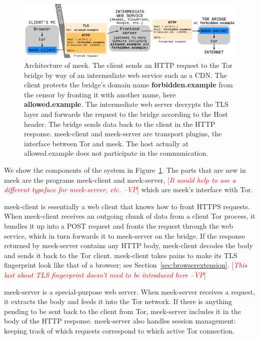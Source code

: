 \documentclass{sig-alternate}
\newcommand{\meekclient}{\mbox{meek-client}\xspace}
\newcommand{\meekserver}{\mbox{meek-server}\xspace}
\newcommand{\meek}{meek\xspace}
\newcommand{\note}[1]{{\textcolor{red}{[\textit{#1}]}}}
\newcommand{\vp}[1]{\note{#1 --VP}}
\begin{document}
\begin{figure}
\centering
\includegraphics[width=\linewidth]{meek-architecture}
\caption{
Architecture of \meek.
The client sends an HTTP request to the Tor bridge by way of an intermediate web service such as a CDN.
The client protects the bridge's domain name \textbf{forbidden.example} from the censor
by fronting it with another name, here \textbf{allowed.example}.
The intermediate web server decrypts the TLS layer and forwards the request to the bridge
according to the Host header.
The bridge sends data back to the client in the HTTP response.
\meekclient and \meekserver are transport plugins, the interface between Tor and \meek.
The host actually at allowed.example does not participate in the communication.
}
\label{fig:meek-architecture}
\end{figure}

We show the components of the system in Figure~\ref{fig:meek-architecture}.
The parts that are new in \meek
are the programs \meekclient and \meekserver,
\vp{It would help to use a different typeface for \meekserver, etc.}
which are \meek's interface with Tor.

\meekclient is essentially a web client that knows how to front HTTPS requests.
When \meekclient receives an outgoing chunk of data from a client Tor process, it bundles it up into a POST request
and fronts the request through the web service,
which in turn forwards it to \meekserver on the bridge.
If the response returned by \meekserver contains any HTTP body,
\meekclient decodes the body and sends it back to the Tor client.
\meekclient takes pains to make its TLS fingerprint
look like that of a browser; see Section~\ref{sec:browserextension}.
\vp{This last about TLS fingerprint doesn't need to be introduced here}

\meekserver is a special-purpose web server.
When \meekserver receives a request, it extracts the body and feeds it into
the Tor network.
If there is anything pending to be sent back to the client from Tor,
\meekserver includes it in the body of the HTTP response.
\meekserver also handles session management:
keeping track of which requests correspond to which active Tor connection.
\end{document}
